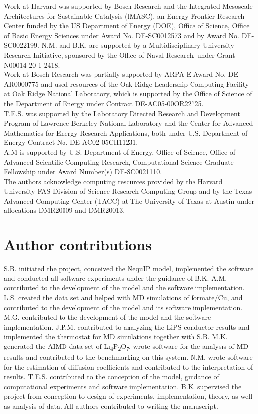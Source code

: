 \documentclass[11pt]{article}
\begin{document}
Work at Harvard was supported by Bosch Research and the Integrated Mesoscale Architectures for Sustainable Catalysis (IMASC), an Energy Frontier Research Center funded by the US Department of Energy (DOE), Office of Science, Office of Basic Energy Sciences under Award No. DE-SC0012573 and by Award No. DE-SC0022199. N.M. and B.K. are supported by a Multidisciplinary	University Research Initiative,	 sponsored	 by	 the Office	 of	 Naval	 Research, under Grant	 N00014-20-1-2418.\\

Work at Bosch Research was partially supported by ARPA-E Award No. DE-AR0000775 and used resources of the Oak Ridge Leadership Computing Facility at Oak Ridge National Laboratory, which is supported by the Office of Science of the Department of Energy under Contract DE-AC05-00OR22725.\\

T.E.S. was supported by the Laboratory Directed Research and Development Program of Lawrence Berkeley National Laboratory and the Center for Advanced Mathematics for Energy Research Applications, both under U.S. Department of Energy Contract No. DE-AC02-05CH11231.\\

A.M is supported by U.S. Department of Energy, Office of Science, Office of Advanced Scientific Computing Research, Computational Science Graduate Fellowship under Award Number(s) DE-SC0021110. \\

The authors acknowledge computing resources provided by the Harvard University FAS Division of Science Research Computing Group and by the Texas Advanced Computing Center (TACC) at The University of Texas at Austin under allocations DMR20009 and DMR20013.

\section{Author contributions}

S.B. initiated the project, conceived the NequIP model, implemented the software and conducted all software experiments under the guidance of B.K. A.M. contributed to the development of the model and the software implementation. L.S. created the data set and helped with MD simulations of formate/Cu, and contributed to the development of the model and its software implementation. M.G. contributed to the development of the model and the software implementation. J.P.M. contributed to analyzing the LiPS conductor results and implemented the thermostat for MD simulations together with S.B. M.K. generated the AIMD data set of Li\textsubscript{4}P\textsubscript{2}O\textsubscript{7}, wrote software for the analysis of MD results and contributed to the benchmarking on this system. N.M. wrote software for the estimation of diffusion coefficients and contributed to the interpretation of results. T.E.S. contributed to the conception of the model, guidance of computational experiments and software implementation. B.K. supervised the project from conception to design of experiments, implementation, theory, as well as analysis of data. All authors contributed to writing the manuscript. 
\end{document}
